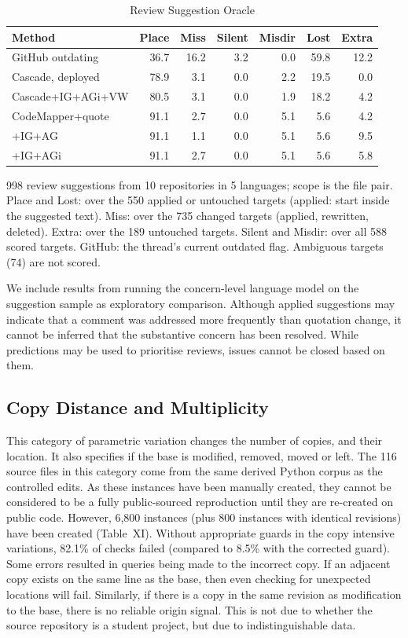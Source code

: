 \documentclass[10pt,conference,letterpaper]{IEEEtran}
\newcommand{\tablenote}[1]{\par\smallskip\parbox{\linewidth}{\footnotesize #1}}
\begin{document}
\begin{table}[!t]\caption{Review Suggestion Oracle}\label{tab:suggestions}
\centering\footnotesize
\setlength{\tabcolsep}{3pt}
\begin{tabular}{@{}lrrrrrr@{}}\toprule
Method & Place & Miss & Silent & Misdir & Lost & Extra \\ \midrule
GitHub outdating & 36.7 & 16.2 & 3.2 & 0.0 & 59.8 & 12.2 \\
Cascade, deployed & 78.9 & 3.1 & 0.0 & 2.2 & 19.5 & 0.0 \\
Cascade+IG+AGi+VW & 80.5 & 3.1 & 0.0 & 1.9 & 18.2 & 4.2 \\
CodeMapper+quote & 91.1 & 2.7 & 0.0 & 5.1 & 5.6 & 4.2 \\
\quad +IG+AG & 91.1 & 1.1 & 0.0 & 5.1 & 5.6 & 9.5 \\
\quad +IG+AGi & 91.1 & 2.7 & 0.0 & 5.1 & 5.6 & 5.8 \\
\bottomrule
\end{tabular}
\tablenote{998 review suggestions from 10 repositories in 5 languages; scope is the file pair. Place and Lost: over the 550 applied or untouched targets (applied: start inside the suggested text). Miss: over the 735 changed targets (applied, rewritten, deleted). Extra: over the 189 untouched targets. Silent and Misdir: over all 588 scored targets. GitHub: the thread's current outdated flag. Ambiguous targets (74) are not scored.}
\end{table}

We include results from running the concern-level language model on the suggestion sample as exploratory comparison. Although applied suggestions may indicate that a comment was addressed more frequently than quotation change, it cannot be inferred that the substantive concern has been resolved. While predictions may be used to prioritise reviews, issues cannot be closed based on them.

\subsection{Copy Distance and Multiplicity}
This category of parametric variation changes the number of copies, and their location. It also specifies if the base is modified, removed, moved or left. The 116 source files in this category come from the same derived Python corpus as the controlled edits. As these instances have been manually created, they cannot be considered to be a fully public-sourced reproduction until they are re-created on public code. However, 6,800 instances (plus 800 instances with identical revisions) have been created (Table~XI). Without appropriate guards in the copy intensive variations, 82.1\% of checks failed (compared to 8.5\% with the corrected guard). Some errors resulted in queries being made to the incorrect copy. If an adjacent copy exists on the same line as the base, then even checking for unexpected locations will fail. Similarly, if there is a copy in the same revision as modification to the base, there is no reliable origin signal. This is not due to whether the source repository is a student project, but due to indistinguishable data.
\end{document}
